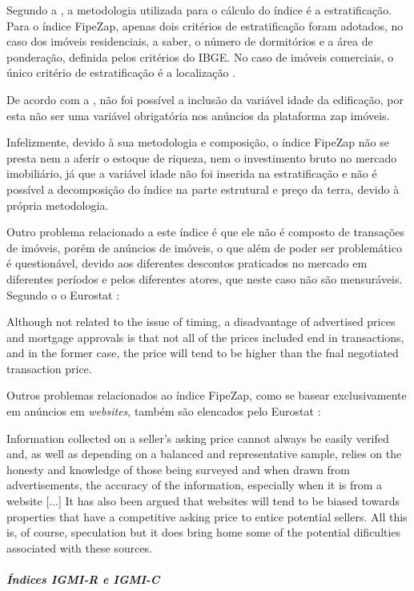 \documentclass[
	12pt,				%
	oneside,			%
	a4paper,			%
	chapter=TITLE,		%
	section=TITLE,		%
	english,			%
	brazil				%
	]{abntex2}
\begin{document}
\begin{refsection}
Segundo a \textcite{fipezap}, a metodologia utilizada para o cálculo do índice é a
estratificação. Para o índice FipeZap, apenas dois critérios de estratificação
foram adotados, no caso dos imóveis residenciais, a saber, o número de
dormitórios e a área de ponderação, definida pelos critérios do IBGE. No caso de
imóveis comerciais, o único critério de estratificação é a localização
\autocite[7]{fipezap}.

De acordo com a \textcite{fipezap}, não foi possível a inclusão da variável idade da
edificação, por esta não ser uma variável obrigatória nos anúncios da plataforma
zap imóveis.

Infelizmente, devido à sua metodologia e composição, o índice FipeZap não se
presta nem a aferir o estoque de riqueza, nem o investimento bruto no mercado
imobiliário, já que a variável idade não foi inserida na estratificação e não é
possível a decomposição do índice na parte estrutural e preço da terra, devido à
própria metodologia.

Outro problema relacionado a este índice é que ele não é composto de transações
de imóveis, porém de anúncios de imóveis, o que além de poder ser problemático é
questionável, devido aos diferentes descontos praticados no mercado em
diferentes períodos e pelos diferentes atores, que neste caso não são
mensuráveis. Segundo o o Eurostat \autocite*[126]{rppi}:
\begin{citacao}
Although not related to the issue of timing, a disadvantage of advertised
prices and mortgage approvals is that not all of the prices included end in
transactions, and in the former case, the price will tend to be higher than the
fnal negotiated transaction price.
\end{citacao}
Outros problemas relacionados ao índice FipeZap, como se basear exclusivamente
em anúncios em \emph{websites}, também são elencados pelo Eurostat \autocite*[104]{rppi}:
\begin{citacao}
Information collected on a seller’s asking price cannot always be easily
verifed and, as well as depending on a balanced and representative sample,
relies on the honesty and knowledge of those being surveyed and when drawn from
advertisements, the accuracy of the information, especially when it is from a
website [...] It has also been argued that websites will tend to be biased
towards properties that have a competitive asking price to entice potential
sellers. All this is, of course, speculation but it does bring home some of the
potential dificulties associated with these sources.
\end{citacao}
\hypertarget{uxedndices-igmi-r-e-igmi-c}{%
\subparagraph{Índices IGMI-R e IGMI-C}\label{uxedndices-igmi-r-e-igmi-c}}


\end{refsection}
\end{document}
